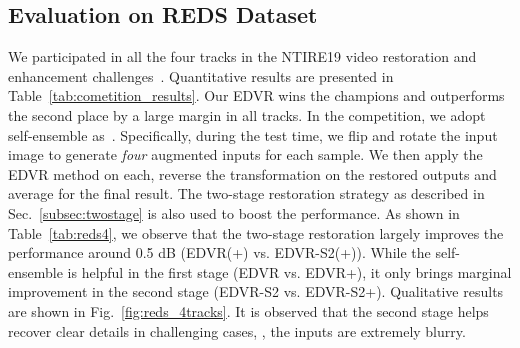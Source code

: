 \documentclass[10pt,twocolumn,letterpaper]{article}
\begin{document}
\subsection{Evaluation on REDS Dataset}
\label{subsec:evaluation_reds}
We participated in all the four tracks in the NTIRE19 video restoration and enhancement challenges~\cite{Nah_2019_CVPR_Workshops_SR,Nah_2019_CVPR_Workshops_Deblur}. Quantitative results are presented in Table~\ref{tab:cometition_results}. Our EDVR wins the champions and outperforms the second place by a large margin in all tracks. 
In the competition, we adopt self-ensemble as~\cite{timofte2016seven,lim2017enhanced}. Specifically, during the test time, we flip and rotate the input image to generate \textit{four} augmented inputs for each sample. We then apply the EDVR method on each, reverse the transformation on the restored outputs and average for the final result. The two-stage restoration strategy as described in Sec.~\ref{subsec:twostage} is also used to boost the performance.
As shown in Table~\ref{tab:reds4}, we observe that the two-stage restoration largely improves the performance around 0.5 dB (EDVR(+) vs. EDVR-S2(+)). While the self-ensemble is helpful in the first stage (EDVR vs. EDVR+), it only brings marginal improvement in the second stage (EDVR-S2 vs. EDVR-S2+). 
Qualitative results are shown in Fig.~\ref{fig:reds_4tracks}. It is observed that the second stage helps recover clear details in challenging cases, \eg, the inputs are extremely blurry.


\begin{table}[t]
	\small
\caption{Evaluation on REDS4 for all the four competition tracks. `+' and `-S2' denote the self-ensemble strategy and two-stage restoration strategy, respectively.}
	\label{tab:reds4}
	\tabcolsep=0.1cm
	\vspace{-0.65cm}
	\begin{center}
	\end{center}
	\vspace{-0.8cm}
\end{table}
 
\end{document}
